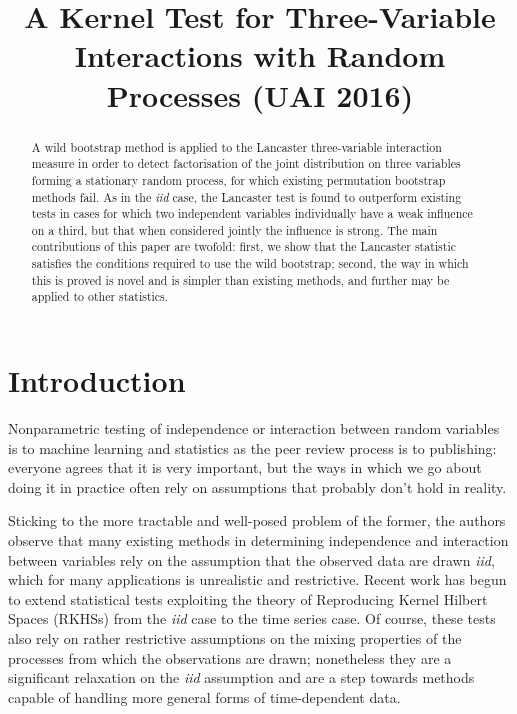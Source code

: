 \documentclass[]{article}
\title{A Kernel Test for Three-Variable Interactions with Random Processes (UAI 2016)}
\author{} %
\begin{document}
\maketitle

\begin{abstract} 

A wild bootstrap method is applied to the Lancaster three-variable interaction measure in order to detect factorisation of the joint distribution on three variables forming a stationary random process, for which existing permutation bootstrap methods fail. As in the \emph{iid} case, the Lancaster test is found to outperform existing tests in cases for which two independent variables individually have a weak influence on a third, but that when considered jointly the influence is strong. The main contributions of this paper are twofold: first, we show that the Lancaster statistic satisfies the conditions required to use the wild bootstrap; second, the way in which this is proved is novel and is simpler than existing methods, and further may be applied to other statistics.

\end{abstract} 

\section{Introduction}
\label{introduction}

Nonparametric testing of independence or interaction between random variables is to machine learning and statistics as the peer review process is to publishing: everyone agrees that it is very important, but the ways in which we go about doing it in practice often rely on assumptions that probably don't hold in reality. 

Sticking to the more tractable and well-posed problem of the former, the authors observe that many existing methods in determining independence and interaction between variables rely on the assumption that the observed data are drawn \emph{iid}, which for many applications is unrealistic and restrictive. Recent work has begun to extend statistical tests exploiting the theory of Reproducing Kernel Hilbert Spaces (RKHSs) from the \emph{iid} case to the time series case. Of course, these tests also rely on rather restrictive assumptions on the mixing properties of the processes from which the observations are drawn; nonetheless they are a significant relaxation on the \emph{iid} assumption and are a step towards methods capable of handling more general forms of time-dependent data. 
\end{document}
